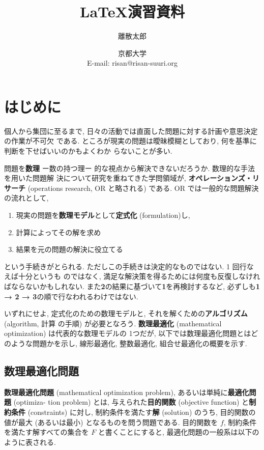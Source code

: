 \documentclass[a4paper,11pt,dvipdfmx]{jsarticle}
\title{{\LaTeX}演習資料}
\author{離散太郎}
\date{京都大学\\E-mail: risan@risan-suuri.org}
\begin{document}
\maketitle

\section{はじめに}
個人から集団に至るまで, 日々の活動では直面した問題に対する計画や意思決定の作業が不可欠 である. 
ところが現実の問題は曖昧模糊としており, 何を基準に判断を下せばいいのかもよくわか らないことが多い. 

問題を\textbf{数理} ー数の持つ理ー 的な視点から解決できないだろうか. 
数理的な手法を用いた問題解 決について研究を重ねてきた学問領域が, \textbf{オペレーションズ・リサーチ} (operations research, OR と略される) である. 
OR では一般的な問題解決の流れとして,

\begin{enumerate}
\item 現実の問題を\textbf{数理モデル}として\textbf{定式化} (formulation)し, 
\item 計算によってその解を求め
\item 結果を元の問題の解決に役立てる
\end{enumerate}

という手続きがとられる. ただしこの手続きは決定的なものではない. 
1 回行なえば十分というも のではなく, 満足な解決策を得るためには何度も反復しなければならないかもしれない. 
また\textbf{2}の結果に基づいて\textbf{1}を再検討するなど, 必ずしも\textbf{1 → 2 → 3}の順で行なわれるわけではない.

いずれにせよ, 定式化のための数理モデルと, それを解くための\textbf{アルゴリズム} (algorithm, 計算 の手順) が必要となろう. 
\textbf{数理最適化} (mathematical optimization) は代表的な数理モデルの 1つだが, 以下では数理最適化問題とはどのような問題かを示し, 線形最適化, 整数最適化, 組合せ最適化の概要を示す.

\subsection{数理最適化問題}
\textbf{数理最適化問題} (mathematical optimization problem), あるいは単純に\textbf{最適化問題} (optimiza- tion problem) とは, 
与えられた\textbf{目的関数} (objective function) と\textbf{制約条件} (constraints) に対し, 制約条件を満たす\textbf{解} (solution) のうち, 
目的関数の値が最大 (あるいは最小) となるものを問う問題である. 
目的関数を $f$, 制約条件を満たす解すべての集合を $F$ と書くことにすると, 最適化問題の一般系は以下のように表される. 
\end{document}
